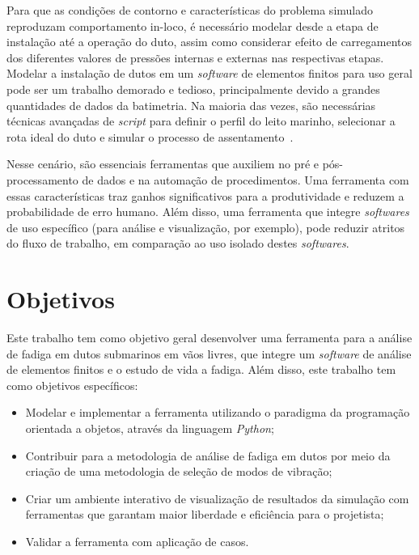 Para que as condições de contorno e características do problema simulado reproduzam comportamento in-loco, é necessário modelar desde a etapa de instalação até a operação do duto, assim como considerar efeito de carregamentos dos diferentes valores de pressões internas e externas nas respectivas etapas.
Modelar a instalação de dutos em um \textit{software} de elementos finitos para uso geral pode ser um trabalho demorado e tedioso, principalmente devido a grandes quantidades de dados da batimetria.
Na maioria das vezes, são necessárias técnicas avançadas de \textit{script} para definir o perfil do leito marinho, selecionar a rota ideal do duto e simular o processo de assentamento~\cite{VandenAbeele2013}.

Nesse cenário, são essenciais ferramentas que auxiliem no pré e pós-processamento de dados e na automação de procedimentos.
Uma ferramenta com essas características traz ganhos significativos para a produtividade e reduzem a probabilidade de erro humano.
Além disso, uma ferramenta que integre \textit{softwares} de uso específico (para análise e visualização, por exemplo), pode reduzir atritos do fluxo de trabalho, em comparação ao uso isolado destes \textit{softwares}.

\section{Objetivos}

Este trabalho tem como objetivo geral desenvolver uma ferramenta para a análise de fadiga em dutos submarinos em vãos livres, 
que integre um \textit{software} de análise de elementos finitos e o estudo de vida a fadiga.
Além disso, este trabalho tem como objetivos específicos:

\begin{itemize}
    \item Modelar e implementar a ferramenta utilizando o paradigma da programação orientada a objetos, através da linguagem \textit{Python};
    \item Contribuir para a metodologia de análise de fadiga em dutos por meio da criação de uma metodologia de seleção de modos de vibração;
    \item Criar um ambiente interativo de visualização de resultados da simulação com ferramentas que garantam maior liberdade e eficiência para o projetista;
    \item Validar a ferramenta com aplicação de casos.
\end{itemize}
